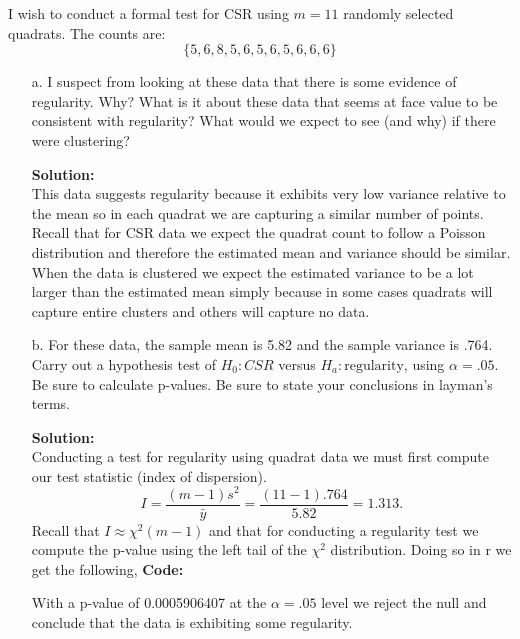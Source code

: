 \documentclass[12pt]{article}
\makeatletter
\theoremstyle{homework}
\newenvironment{exercise}[1]
{\def\@currentlabel{#1}\exercisecore}
{\endexercisecore}
\newcommand{\localhead}[1]{\par\smallskip\noindent\textbf{#1}\nobreak\\}%
\newcommand\solution{\localhead{Solution:}}
\makeatother
\begin{document}
\begin{exercise}{4} I wish to conduct a formal test for CSR using $m = 11$ randomly selected quadrats. The counts are:
  \begin{equation*}
    \{5,6,8,5,6,5,6,5,6,6,6\}
  \end{equation*}
  \begin{enumerate}
    \item[a.] I suspect from looking at these data that there is some evidence of regularity. Why? What is it about these data that seems at face value to 
    be consistent with regularity? What would we expect to see (and why) if there were clustering?\\
    \solution This data suggests regularity because it exhibits very low variance relative to the mean so in each quadrat we are capturing a similar number of points. Recall that for CSR data we expect the quadrat count to follow a Poisson distribution and therefore the estimated mean and variance should be similar. 
    When the data is clustered we expect the estimated variance to be a lot larger than the estimated mean simply because in some cases quadrats will capture entire clusters and others will capture no data.\\
    \vspace{.15in}


    \item[b.] For these data, the sample mean is 5.82 and the sample variance is .764. Carry out a hypothesis test of 
    $H_0: CSR$ versus $H_a: \text{regularity}$, using $\alpha = .05$. Be sure to calculate p-values. Be sure to state your conclusions in layman's terms.\\
    \solution Conducting a test for regularity using quadrat data we must first compute our test statistic (index of dispersion). 
    \begin{equation*}
      I = \dfrac{(m - 1)s^2}{\bar{y}} = \dfrac{(11 - 1).764}{5.82} = 1.313. 
    \end{equation*}
    Recall that $I \approx \chi^2(m-1)$ and that for conducting a regularity test we compute the p-value using the left tail of the $\chi^2$ distribution. Doing so in r we get the following, 
    \textbf{Code:}
    \begin{center}
    
    \end{center}
    With a p-value of 0.0005906407 at the $\alpha = .05$ level we reject the null and conclude that the data is exhibiting some regularity. 
  \end{enumerate}
\end{exercise}
\vspace{.5in}
\end{document}
